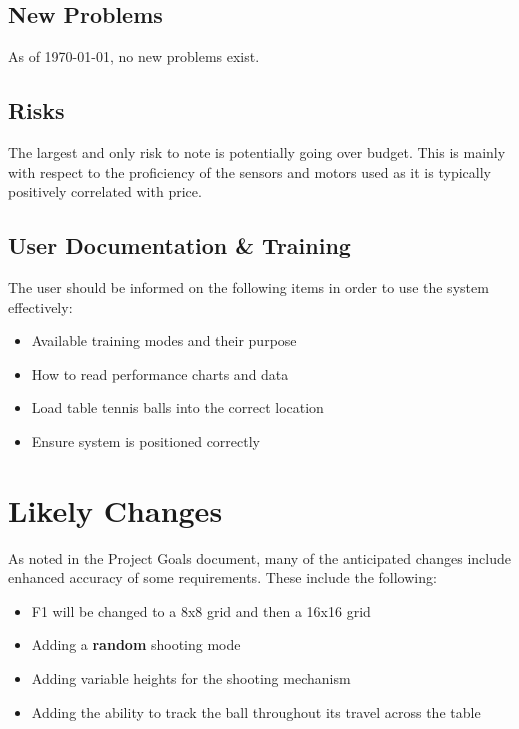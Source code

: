 \documentclass[11pt]{article}
\begin{document}
\subsection{New Problems}
As of \today, no new problems exist.
\subsection{Risks}
The largest and only risk to note is potentially going over budget. This is mainly with respect to the proficiency of the sensors and motors used as it is typically positively correlated with price. 
\subsection{User Documentation \& Training}
The user should be informed on the following items in order to use the system effectively:
\begin{itemize}
\item Available training modes and their purpose
\item How to read performance charts and data
\item Load table tennis balls into the correct location
\item Ensure system is positioned correctly
\end{itemize}
\section{Likely Changes}
As noted in the Project Goals document, many of the anticipated changes include enhanced accuracy of some requirements. These include the following:
\begin{itemize}
\item F1 will be changed to a 8x8 grid and then a 16x16 grid
\item Adding a \textbf{random} shooting mode
\item Adding variable heights for the shooting mechanism
\item Adding the ability to track the ball throughout its travel across the table
\end{itemize}
\end{document}

